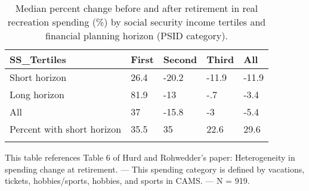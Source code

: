 \begin{table}[tbp] \centering
{}

\caption{Median percent change before and after retirement in real recreation spending (\%) by social security income tertiles and financial planning horizon (PSID category).}
\begin{tabularx}{\textwidth}{lCCCC}

\toprule
{SS\_Tertiles}&{First}&{Second}&{Third}&{All} \tabularnewline
\midrule\addlinespace[1.5ex]
Short horizon&26.4&-20.2&-11.9&-11.9 \tabularnewline
Long horizon&81.9&-13&-.7&-3.4 \tabularnewline
All&37&-15.8&-3&-5.4 \tabularnewline
Percent with short horizon&35.5&35&22.6&29.6 \tabularnewline
\bottomrule \addlinespace[1.5ex]

\end{tabularx}
\begin{flushleft}
\footnotesize This table references Table 6 of Hurd and Rohwedder's paper: Heterogeneity in spending change at retirement. \linebreak --- \linebreak This spending category is defined by vacations, tickets, hobbies/sports, hobbies, and sports in CAMS. \linebreak --- \linebreak N = 919.
\end{flushleft}
\end{table}
